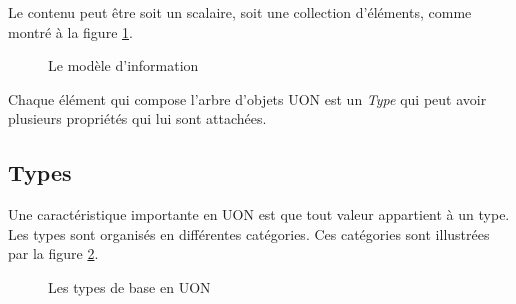 \documentclass[
    iict, %
    il, %
]{heig-tb}
\begin{document}
Le contenu peut être soit un scalaire, soit une collection d'éléments, comme montré à la figure \ref{information-model}.

\begin{figure}[H]
    \begin{center}
    \end{center}
    \caption[Le modèle d'information]{\label{information-model}Le modèle d'information}
\end{figure}

Chaque élément qui compose l'arbre d'objets UON est un \emph{Type} qui peut avoir plusieurs propriétés qui lui sont attachées.

\subsection{Types}
Une caractéristique importante en UON est que tout valeur appartient à un type. Les types sont organisés en différentes catégories.
Ces catégories sont illustrées par la figure \ref{type-base}.

\begin{figure}[H]
    \begin{center}
    \end{center}
    \caption[Les types de base en UON]{\label{type-base}Les types de base en UON}
\end{figure}
\end{document}
